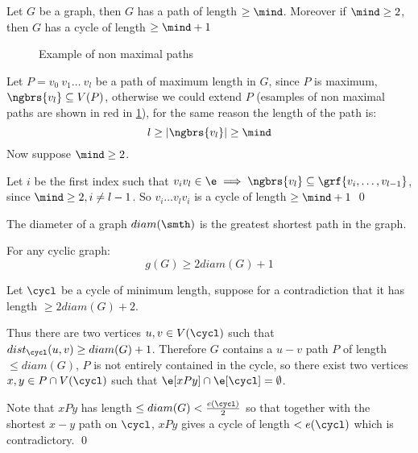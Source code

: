 \begin{customproposition}{1.6}
    \label{proposition:1.6}
    Let $G$ be a graph, then $G$ has a path of length $\geq \mind$. Moreover if $\mind \geq 2$, then $G$ has a cycle of length $\geq \mind + 1$
\end{customproposition}
\begin{prf}
    \begin{figure}[h]
        \centering
        
        \caption{Example of non maximal paths}
        \label{fig:proposition1.6}
    \end{figure}
    Let $P = v_0\:v_1\dots\:v_l$ be a path of maximum length in $G$, since $P$ is maximum, $\ngbrs{v_l} \subseteq V(P)$, otherwise we could extend $P$ (esamples of non maximal paths are shown in red in \ref{fig:proposition1.6}), for the same reason the length of the path is:
    \begin{equation*}
        l \geq |\ngbrs{v_l}| \geq \mind
    \end{equation*}
    Now suppose $\mind \geq 2$.

    Let $i$ be the first index such that $v_iv_l \in \e \implies \ngbrs{v_l} \subseteq \grf{v_i, \dots, v_{l - 1}}$, since $\mind \geq 2, i \neq l - 1$. So $v_i \dots v_lv_i$ is a cycle of length $\geq \mind + 1$ \qed
\end{prf}
\begin{definition}[Diameter]
    The diameter of a graph $diam(\smth)$ is the greatest shortest path in the graph.
\end{definition}
\begin{customproposition}{1.7}
    \label{proposition:1.7}
    For any cyclic graph:
    \begin{equation*}
        g(G) \geq 2diam(G) + 1
    \end{equation*}
\end{customproposition}
\begin{prf}
    Let $\cycl$ be a cycle of minimum length, suppose for a contradiction that it has length $\geq 2diam(G) + 2$.

    Thus there are two vertices $u, v \in V(\cycl)$ such that $dist_{\cycl}(u, v) \geq diam(G) + 1$. Therefore $G$ contains a $u - v$ path $P$ of length $\leq diam(G)$, $P$ is not entirely contained in the cycle, so there exist two vertices $x, y \in P \cap V(\cycl)$ such that $\e[xPy] \cap \e[\cycl] = \emptyset$.

    Note that $xPy$ has length $\leq diam(G) < \frac{e(\cycl)}{2}$ so that together with the shortest $x - y$ path on $\cycl$, $xPy$ gives a cycle of length $< e(\cycl)$ which is contradictory. \qed
\end{prf}
